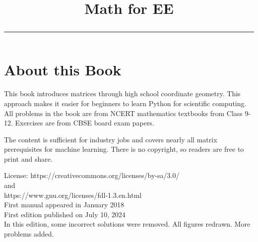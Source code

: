 \documentclass[journal]{IEEEtran}
\begin{document}

\onecolumn


\title{
    \begin{center}
    Math for EE
    \\
\rule{0.4\columnwidth}{0.4pt}
\end{center}
}
\section*{About this Book}

This book introduces matrices through high school coordinate geometry. This approach makes it easier for beginners to learn Python for scientific computing. All problems in the book are from NCERT mathematics textbooks from Class 9-12.  Exercises are from CBSE board exam papers.   

The content is sufficient for industry jobs and covers nearly all matrix prerequisites for machine learning.
There is no copyright, so readers are free to print and share.  

License: https://creativecommons.org/licenses/by-sa/3.0/
\\
and
\\
https://www.gnu.org/licenses/fdl-1.3.en.html
\\
First manual appeared in January 2018
\\
First edition published on July 10, 2024
\\
In this edition, some incorrect solutions were removed.  All figures redrawn. More problems added.
\end{document}
